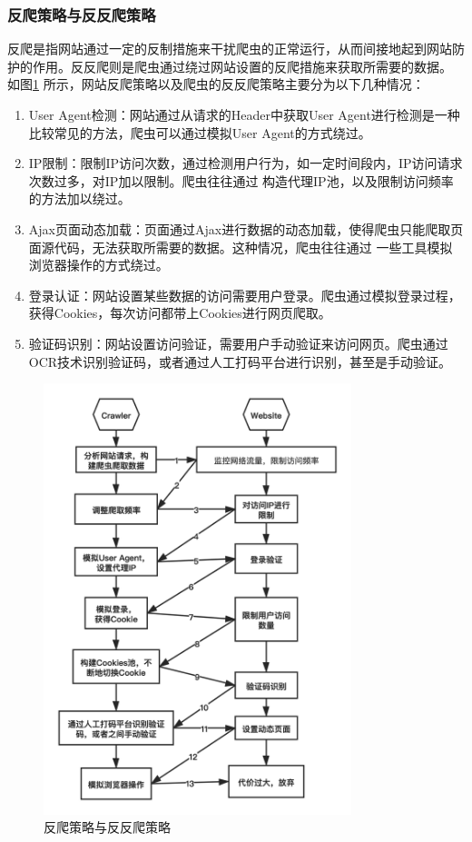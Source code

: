 \documentclass[master]{njuthesis}
\begin{document}
\subsubsection{反爬策略与反反爬策略}
反爬是指网站通过一定的反制措施来干扰爬虫的正常运行，从而间接地起到网站防护的作用。反反爬则是爬虫通过绕过网站设置的反爬措施来获取所需要的数据。
如图\ref{fig:strategy} 所示，网站反爬策略以及爬虫的反反爬策略主要分为以下几种情况：
\begin{enumerate}
  \item User Agent检测：网站通过从请求的Header中获取User Agent进行检测是一种比较常见的方法，爬虫可以通过模拟User Agent的方式绕过。
  \item IP限制：限制IP访问次数，通过检测用户行为，如一定时间段内，IP访问请求次数过多，对IP加以限制。爬虫往往通过
  构造代理IP池，以及限制访问频率的方法加以绕过。
  \item Ajax页面动态加载：页面通过Ajax进行数据的动态加载，使得爬虫只能爬取页面源代码，无法获取所需要的数据。这种情况，爬虫往往通过
  一些工具模拟浏览器操作的方式绕过。
  \item 登录认证：网站设置某些数据的访问需要用户登录。爬虫通过模拟登录过程，获得Cookies，每次访问都带上Cookies进行网页爬取。
  \item 验证码识别：网站设置访问验证，需要用户手动验证来访问网页。爬虫通过OCR技术识别验证码，或者通过人工打码平台进行识别，甚至是手动验证。
\end{enumerate}


\begin{figure}[htbp]
\centering
\includegraphics[width=0.8\textwidth]{pic/anti-strategy.png}
\caption{反爬策略与反反爬策略}\label{fig:strategy}
\end{figure}
\end{document}
